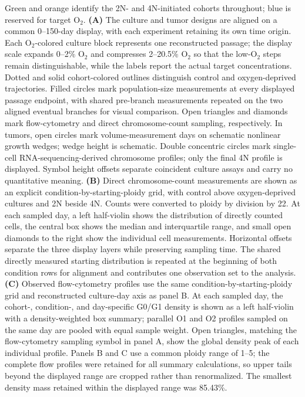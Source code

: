 \documentclass[11pt]{article}
\begin{document}
\noindent Green and orange identify the 2N- and 4N-initiated cohorts throughout; blue is reserved for target O$_2$.
\textbf{(A)} The culture and tumor designs are aligned on a common 0--150-day display, with each experiment retaining its own time origin. Each O$_2$-colored culture block represents one reconstructed passage; the display scale expands 0--2\% O$_2$ and compresses 2--20.5\% O$_2$ so that the low-O$_2$ steps remain distinguishable, while the labels report the actual target concentrations. Dotted and solid cohort-colored outlines distinguish control and oxygen-deprived trajectories. Filled circles mark population-size measurements at every displayed passage endpoint, with shared pre-branch measurements repeated on the two aligned eventual branches for visual comparison. Open triangles and diamonds mark flow-cytometry and direct chromosome-count sampling, respectively. In tumors, open circles mark volume-measurement days on schematic nonlinear growth wedges; wedge height is schematic. Double concentric circles mark single-cell RNA-sequencing-derived chromosome profiles; only the final 4N profile is displayed. Symbol height offsets separate coincident culture assays and carry no quantitative meaning.
\textbf{(B)} Direct chromosome-count measurements are shown as an explicit condition-by-starting-ploidy grid, with control above oxygen-deprived cultures and 2N beside 4N. Counts were converted to ploidy by division by 22. At each sampled day, a left half-violin shows the distribution of directly counted cells, the central box shows the median and interquartile range, and small open diamonds to the right show the individual cell measurements. Horizontal offsets separate the three display layers while preserving sampling time. The shared directly measured starting distribution is repeated at the beginning of both condition rows for alignment and contributes one observation set to the analysis.
\textbf{(C)} Observed flow-cytometry profiles use the same condition-by-starting-ploidy grid and reconstructed culture-day axis as panel B. At each sampled day, the cohort-, condition-, and day-specific G0/G1 density is shown as a left half-violin with a density-weighted box summary; parallel O1 and O2 profiles sampled on the same day are pooled with equal sample weight. Open triangles, matching the flow-cytometry sampling symbol in panel A, show the global density peak of each individual profile. Panels B and C use a common ploidy range of 1--5; the complete flow profiles were retained for all summary calculations, so upper tails beyond the displayed range are cropped rather than renormalized. The smallest density mass retained within the displayed range was 85.43\%.
\end{document}
